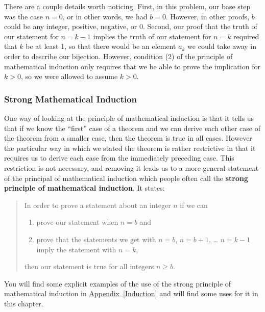 \documentclass[10pt,]{book}
\newcommand{\terminology}[1]{\textbf{#1}}
\theoremstyle{plain}
\theoremstyle{definition}
\theoremstyle{definition}
\numberwithin{equation}{chapter}
\begin{document}
\par
There are a couple details worth noticing. First, in this problem, our base step was the case \(n=0\), or in other words, we had \(b=0\). However, in other proofs, \(b\) could be any integer, positive, negative, or 0. Second, our proof that the truth of our statement for \(n=k-1\) implies the truth of our statement for \(n=k\) required that \(k\) be at least 1, so that there would be an element \(a_k\) we could take away in order to describe our bijection. However, condition (2) of the principle of mathematical induction only requires that we be able to prove the implication for \(k>0\), so we were allowed to assume \(k>0\).%
\typeout{************************************************}
\typeout{************************************************}
\subsubsection[{Strong Mathematical Induction}]{Strong Mathematical Induction}\label{subsubsection-1}
One way of looking at the principle of mathematical induction is that it tells us that if we know the ``first'' case of a theorem and we can derive each other case of the theorem from a smaller case, then the theorem is true in all cases. However the particular way in which we stated the theorem is rather restrictive in that it requires us to derive each case from the immediately preceding case. This restriction is not necessary, and removing it leads us to a more general statement of the principal of mathematical induction which people often call the \terminology{strong principle of mathematical induction}. It states:%
\begin{quote}\hypertarget{blockquote-8}{}
In order to prove a statement about an integer \(n\) if we can \leavevmode%
\begin{enumerate}
\item\hypertarget{li-11}{}prove our statement when \(n=b\) and%
\item\hypertarget{li-12}{}prove that the statements we get with \(n=b\), \(n=b+1\), \dots{} \(n=k-1\) imply the statement with \(n=k\),%
\end{enumerate}
 then our statement is true for all integers \(n\ge b\).%
\end{quote}
You will find some explicit examples of the use of the strong principle of mathematical induction in \hyperref[Induction]{Appendix~\ref{Induction}} and will find some uses for it in this chapter.%
\typeout{************************************************}
\typeout{************************************************}
\end{document}
